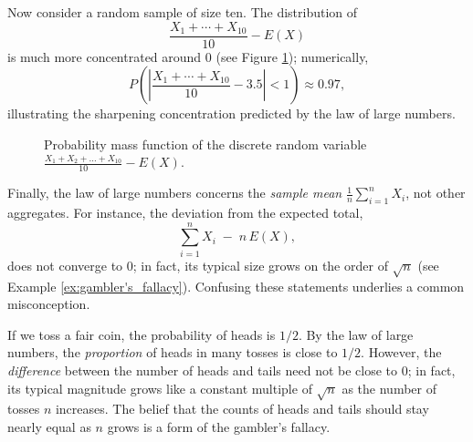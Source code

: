 \begin{example}
Now consider a random sample of size ten. The distribution of
\[
\frac{X_1 + \cdots + X_{10}}{10} - E(X)
\]
is much more concentrated around $0$ (see Figure \ref{fig:law_large_numbers_2}); numerically,
\[
P\!\left(\left|\frac{X_1+\cdots+X_{10}}{10} - 3.5\right| < 1\right) \approx 0.97,
\]
illustrating the sharpening concentration predicted by the law of large numbers.

\begin{figure}[t]
\centering
{}
\caption{\label{fig:law_large_numbers_2}Probability mass function of the discrete random variable $\frac{X_1 + X_2 + \ldots +  X_{10}}{10} - E(X)$.}
\end{figure}

\end{example}

Finally, the law of large numbers concerns the \emph{sample mean} $\frac{1}{n}\sum_{i=1}^n X_i$, not other aggregates. For instance, the deviation from the expected total,
\[
\sum_{i=1}^n X_i \;-\; n\,E(X),
\]
does not converge to $0$; in fact, its typical size grows on the order of $\sqrt{n}$ (see Example \ref{ex:gambler's_fallacy}). Confusing these statements underlies a common misconception.

\begin{example}
\label{ex:gambler's_fallacy}
If we toss a fair coin, the probability of heads is $1/2$. By the law of large numbers, the \emph{proportion} of heads in many tosses is close to $1/2$. However, the \emph{difference} between the number of heads and tails need not be close to $0$; in fact, its typical magnitude grows like a constant multiple of $\sqrt{n}$ as the number of tosses $n$ increases. The belief that the counts of heads and tails should stay nearly equal as $n$ grows is a form of the gambler’s fallacy.
\end{example}

